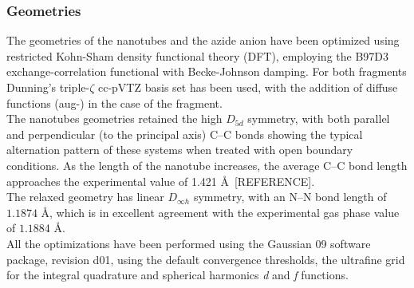 \documentclass[utf8]{article}
\begin{document}
\subsubsection{Geometries}
The geometries of the nanotubes and the azide anion have been optimized using restricted Kohn-Sham density functional theory (DFT), employing the B97D3 exchange-correlation functional with Becke-Johnson damping\cite{Grimme2010,Grimme2011}.
For both fragments Dunning's triple-$\zeta$ cc-pVTZ basis set\cite{DunningJr1989} has been used, with the addition of diffuse functions (aug-)\cite{Kendall1992} in the case of the \ntm fragment.\\
The nanotubes geometries retained the high $D_{5d}$ symmetry, with both parallel and perpendicular (to the principal axis) C--C bonds showing the typical alternation pattern of these systems when treated with open boundary conditions\cite{Zhou2004,Galano2006}. As the length of the nanotube increases, the average C--C bond length approaches the experimental value of 1.421 \AA\ [REFERENCE].\\
The relaxed \ntm geometry has linear $D_{\infty h}$ symmetry, with an N--N bond length of $1.1874$ \AA, which is in excellent agreement with the experimental gas phase value of $1.1884$ \AA\cite{Polak1987}.\\
All the optimizations have been performed using the Gaussian 09 software package, revision d01\cite{g09}, using the default convergence thresholds, the ultrafine grid for the integral quadrature and spherical harmonics \textit{d} and \textit{f} functions.
\end{document}
